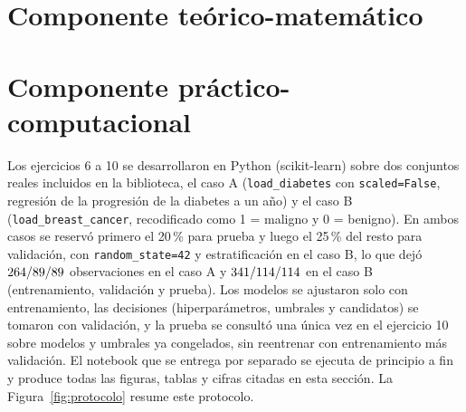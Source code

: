\documentclass[11pt]{article}
\begin{document}


\tableofcontents
\newpage

\section{Componente teórico-matemático}






\newpage
\section{Componente práctico-computacional}
\label{sec:practico}

\noindent Los ejercicios 6 a 10 se desarrollaron en Python (scikit-learn) sobre
dos conjuntos reales incluidos en la biblioteca, el caso A
(\texttt{load\_diabetes} con \texttt{scaled=False}, regresión de la progresión
de la diabetes a un año) y el caso B (\texttt{load\_breast\_cancer},
recodificado como 1 = maligno y 0 = benigno). En ambos casos se reservó
primero el 20\,\% para prueba y luego el 25\,\% del resto para validación,
con \texttt{random\_state=42} y estratificación en el caso B, lo que dejó
$264/89/89$ observaciones en el caso A y
$341/114/114$ en el caso B (entrenamiento, validación y
prueba). Los modelos se ajustaron solo con entrenamiento, las decisiones
(hiperparámetros, umbrales y candidatos) se tomaron con validación, y la
prueba se consultó una única vez en el ejercicio 10 sobre modelos y umbrales
ya congelados, sin reentrenar con entrenamiento más validación. El notebook
que se entrega por separado se ejecuta de principio a fin y produce todas
las figuras, tablas y cifras citadas en esta sección.
La Figura~\ref{fig:protocolo} resume este protocolo.









\newpage
\appendix

\end{document}

